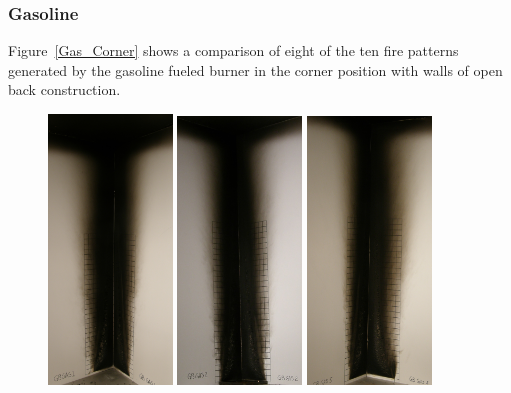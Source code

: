 \documentclass[twoside]{uocthesis}
\begin{document}
\subsubsection{Gasoline}

Figure~\ref{Gas_Corner} shows a comparison of eight of the ten fire patterns generated by the gasoline fueled burner in the corner position with walls of open back construction. 

\begin{figure}[p]
	\includegraphics[width=1.3in]{../Figures/GBGas1C_P5270387}
	\includegraphics[width=1.3in]{../Figures/GBGas2C_P5270454}
	\includegraphics[width=1.3in]{../Figures/GBGas5C_P5270493}

\end{figure}
\end{document}
